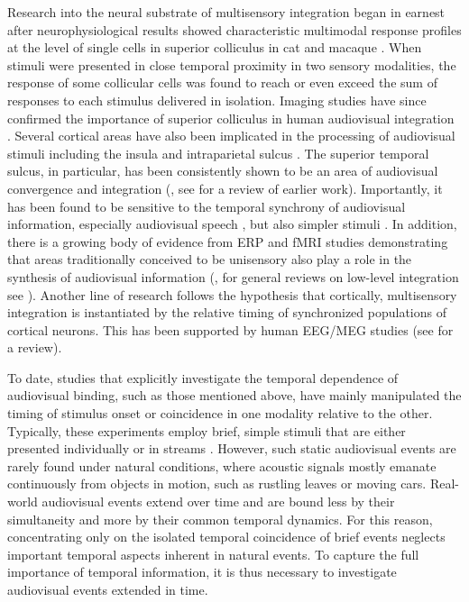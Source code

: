 Research into the neural substrate of multisensory integration began in
earnest after neurophysiological results showed characteristic multimodal
response profiles at the level of single cells in superior colliculus in
cat \citep{meredith1983a, meredith1987a} and macaque \citep{wallace1996a}.
When stimuli were presented in close temporal proximity in two sensory
modalities, the response of some collicular cells was found to reach or
even exceed the sum of responses to each stimulus delivered in isolation.
Imaging studies have since confirmed the importance of superior colliculus
in human audiovisual integration \citep{calvert2001b, miller2005a}.
Several cortical areas have also been implicated in the processing of
audiovisual stimuli including the insula \citep{bushara2001a} and
intraparietal sulcus \citep{calvert2001c}. The superior temporal sulcus, in
particular, has been consistently shown to be an area of audiovisual
convergence and integration (\cite{beauchamp2004a}, see \cite{calvert2001b}
for a review of earlier work).  Importantly, it has been found to be
sensitive to the temporal synchrony of audiovisual information, especially
audiovisual speech \citep{calvert2000a, miller2005a, macaluso2004a}, but
also simpler stimuli \citep{noesselt2007a, atteveldt2007a}.  In addition,
there is a growing body of evidence from ERP  and fMRI  studies demonstrating that areas traditionally conceived
to be unisensory also play a role in the synthesis of audiovisual
information (\cite{giard1999a, molholm2002a, kayser2007a, calvert1999a,
miller2005a, noesselt2007a}, for general reviews on low-level integration
see \cite{foxe2005a, kayser2007b, driver2008a}). Another line of research
follows the hypothesis that cortically, multisensory integration is
instantiated by the relative timing of synchronized populations of cortical
neurons. This has been supported by human EEG/MEG
 studies (see \cite{
senkowski2008a} for a review). 



To date, studies that explicitly investigate the temporal dependence of
audiovisual binding, such as those mentioned above, have mainly manipulated
the timing of stimulus onset or coincidence in one modality relative to the
other. Typically, these experiments employ brief, simple stimuli that are
either presented individually \citep{meredith1987a, bushara2001a} or in
streams \citep{calvert2001c, noesselt2007a, dhamala2007a, senkowski2007a}.
However, such static audiovisual events are rarely found under natural
conditions, where acoustic signals mostly emanate continuously from objects
in motion, such as rustling leaves or moving cars. Real-world audiovisual
events extend over time and are bound less by their simultaneity and more
by their common temporal dynamics. For this reason, concentrating only on
the isolated temporal coincidence of brief events neglects important
temporal aspects inherent in natural events. To capture the full importance
of temporal information, it is thus necessary to investigate audiovisual
events extended in time. 



